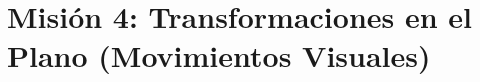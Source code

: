 \documentclass[12pt, letterpaper]{article}
\newcommand{\boxfill}[1][1.5cm]{\tcbox[on line, size=minimal,
	colframe=valdark!60, colback=boxbg, boxrule=0.8pt, arc=1mm,
	boxsep=3pt, left=2pt, right=2pt, top=2pt, bottom=2pt]%
	{\makebox[#1]{\vphantom{M}}}}
\begin{document}

	\section*{Misión 4: Transformaciones en el Plano (Movimientos Visuales)}
	
\end{document}
